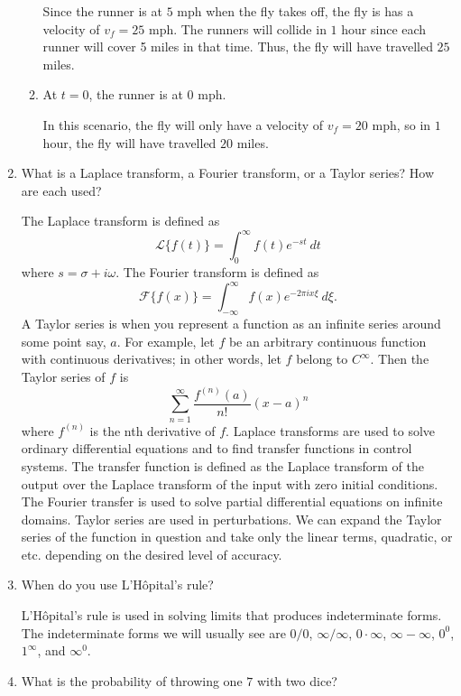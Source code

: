 \begin{enumerate}
\begin{enumerate}[label = {Case \arabic*:}]
    Since the runner is at \(5\) mph when the fly takes off, the fly is has a
    velocity of \(v_f = 25\) mph.
    The runners will collide in \(1\) hour since each runner will cover 5 miles
    in that time.
    Thus, the fly will have travelled \(25\) miles. 
  \item
    At \(t = 0\), the runner is at \(0\) mph.
    \par\smallskip
    In this scenario, the fly will only have a velocity of \(v_f = 20\) mph, so
    in \(1\) hour, the fly will have travelled \(20\) miles.
  \end{enumerate}
\item
  What is a Laplace transform, a Fourier transform, or a Taylor series?
  How are each used?
  \par\smallskip
  The Laplace transform is defined as
  \[
  \mathcal{L}\{f(t)\} = \int_0^{\infty}f(t)e^{-st} \ dt
  \]
  where \(s = \sigma + i\omega\).
  The Fourier transform is defined as
  \[
  \mathcal{F}\{f(x)\} = \int_{-\infty}^{\infty}f(x)e^{-2\pi ix\xi} \ d\xi.
  \]
  A Taylor series is when you represent a function as an infinite series around
  some point say, \(a\).
  For example, let \(f\) be an arbitrary continuous function with continuous
  derivatives; in other words, let \(f\) belong to \(C^{\infty}\).
  Then the Taylor series of \(f\) is
  \[
  \sum_{n = 1}^{\infty}\frac{f^{(n)}(a)}{n!}(x - a)^n
  \]
  where \(f^{(n)}\) is the nth derivative of \(f\).
  Laplace transforms are used to solve ordinary differential equations and to
  find transfer functions in control systems.
  The transfer function is defined as the Laplace transform of the output
  over the Laplace transform of the input with zero initial conditions.
  The Fourier transfer is used to solve partial differential equations on
  infinite domains.
  Taylor series are used in perturbations.
  We can expand the Taylor series of the function in question and take only
  the linear terms, quadratic, or etc. depending on the desired level of
  accuracy.
\item
  When do you use L'H{\^o}pital's rule?
  \par\smallskip
  L'H{\^o}pital's rule is used in solving limits that produces indeterminate
  forms.
  The indeterminate forms we will usually see are \(0/0\), \(\infty/\infty\),
  \(0\cdot\infty\), \(\infty - \infty\), \(0^0\), \(1^{\infty}\), and
  \(\infty^0\).
\item
  What is the probability of throwing one \(7\) with two dice?
  \par\smallskip

\end{enumerate}
